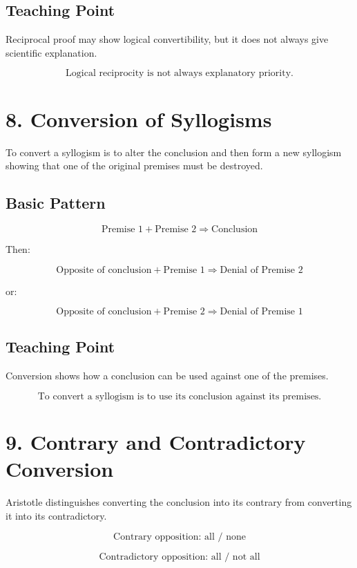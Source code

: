 \documentclass[12pt]{article}
\begin{document}
\subsection*{Teaching Point}

Reciprocal proof may show logical convertibility, but it does not always give
scientific explanation.

\[
\boxed{
\text{Logical reciprocity is not always explanatory priority.}
}
\]

\section*{8. Conversion of Syllogisms}

To convert a syllogism is to alter the conclusion and then form a new syllogism
showing that one of the original premises must be destroyed.

\subsection*{Basic Pattern}

\[
\text{Premise 1} + \text{Premise 2} \Rightarrow \text{Conclusion}
\]

Then:

\[
\text{Opposite of conclusion} + \text{Premise 1}
\Rightarrow
\text{Denial of Premise 2}
\]

or:

\[
\text{Opposite of conclusion} + \text{Premise 2}
\Rightarrow
\text{Denial of Premise 1}
\]

\subsection*{Teaching Point}

Conversion shows how a conclusion can be used against one of the premises.

\[
\boxed{
\text{To convert a syllogism is to use its conclusion against its premises.}
}
\]

\section*{9. Contrary and Contradictory Conversion}

Aristotle distinguishes converting the conclusion into its contrary from
converting it into its contradictory.

\[
\text{Contrary opposition: all / none}
\]

\[
\text{Contradictory opposition: all / not all}
\]
\end{document}
